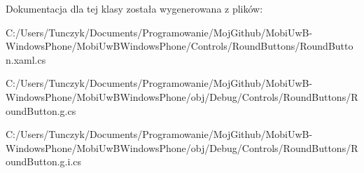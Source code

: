 Dokumentacja dla tej klasy została wygenerowana z plików\+:\begin{DoxyCompactItemize}
\item 
C\+:/\+Users/\+Tunczyk/\+Documents/\+Programowanie/\+Moj\+Github/\+Mobi\+Uw\+B-\/\+Windows\+Phone/\+Mobi\+Uw\+B\+Windows\+Phone/\+Controls/\+Round\+Buttons/Round\+Button.\+xaml.\+cs\item 
C\+:/\+Users/\+Tunczyk/\+Documents/\+Programowanie/\+Moj\+Github/\+Mobi\+Uw\+B-\/\+Windows\+Phone/\+Mobi\+Uw\+B\+Windows\+Phone/obj/\+Debug/\+Controls/\+Round\+Buttons/Round\+Button.\+g.\+cs\item 
C\+:/\+Users/\+Tunczyk/\+Documents/\+Programowanie/\+Moj\+Github/\+Mobi\+Uw\+B-\/\+Windows\+Phone/\+Mobi\+Uw\+B\+Windows\+Phone/obj/\+Debug/\+Controls/\+Round\+Buttons/Round\+Button.\+g.\+i.\+cs\end{DoxyCompactItemize}
